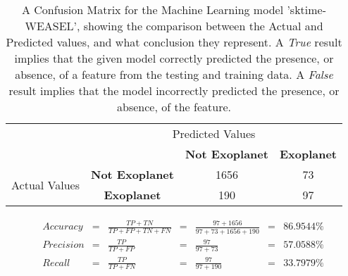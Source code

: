 
    \renewcommand{\arraystretch}{2}
    \renewcommand{\tabcolsep}{20.25pt}
    \begin{table}[ht]
    \begin{tabular}{cccc}
     & \multicolumn{3}{c}{Predicted Values} \\ \cline{3-4}
     & \multicolumn{1}{c|}{} & \multicolumn{1}{c|}{\textbf{Not Exoplanet}} & \multicolumn{1}{c|}{\textbf{Exoplanet}} \\ \cline{2-4}
    \multicolumn{1}{c|}{\multirow{2}{2.0cm}{Actual Values}} & \multicolumn{1}{c|}{\textbf{Not Exoplanet}} & \multicolumn{1}{c|}{1656} & \multicolumn{1}{c|}{73} \\ \cline{2-4}
    \multicolumn{1}{c|}{} & \multicolumn{1}{c|}{\textbf{Exoplanet}} & \multicolumn{1}{c|}{190} & \multicolumn{1}{c|}{97} \\ \cline{2-4}
    \end{tabular}
    \caption{A Confusion Matrix for the Machine Learning model 'sktime-WEASEL', showing the comparison between the Actual and Predicted values, and what conclusion they represent. A \emph{True} result implies that the given model correctly predicted the presence, or absence, of a feature from the testing and training data. A \emph{False} result implies that the model incorrectly predicted the presence, or absence, of the feature.}
    \label{tab:sktime-WEASELconfusionmatrix}
    \end{table}

    \label{eq:precisionsktime-WEASEL}
    \begin{align*}
        Accuracy &= &\frac{TP + TN}{TP + FP + TN + FN} &= &\frac{97 + 1656}{97 + 73 + 1656 + 190} &= & 86.9544\% \\
        Precision &= &\frac{TP}{TP + FP} &= &\frac{97}{97 + 73} &= & 57.0588\% \\
        Recall &= &\frac{TP}{TP + FN} &= &\frac{97}{97 + 190} &= & 33.7979\% \\
    \end{align*}

    \renewcommand{\arraystretch}{1}
    \renewcommand{\tabcolsep}{5.25pt}
    